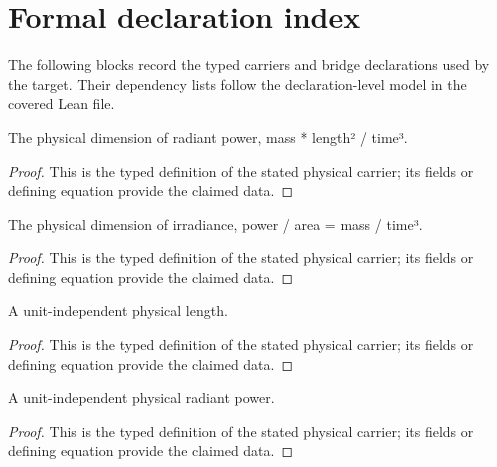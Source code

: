 \section*{Formal declaration index}
The following blocks record the typed carriers and bridge declarations used by the target.  Their dependency lists follow the declaration-level model in the covered Lean file.

\begin{definition}
  \label{def:physics:IPhO_2026_2_B_3:aux001}
  The physical dimension of radiant power, mass * length² / time³.
\end{definition}
\begin{proof}
  This is the typed definition of the stated physical carrier; its fields or defining equation provide the claimed data.
\end{proof}

\begin{definition}
  \label{def:physics:IPhO_2026_2_B_3:aux002}
  The physical dimension of irradiance, power / area = mass / time³.
\end{definition}
\begin{proof}
  This is the typed definition of the stated physical carrier; its fields or defining equation provide the claimed data.
\end{proof}

\begin{definition}
  \label{def:physics:IPhO_2026_2_B_3:aux003}
  A unit-independent physical length.
\end{definition}
\begin{proof}
  This is the typed definition of the stated physical carrier; its fields or defining equation provide the claimed data.
\end{proof}

\begin{definition}
  \label{def:physics:IPhO_2026_2_B_3:aux004}
  A unit-independent physical radiant power.
\end{definition}
\begin{proof}
  This is the typed definition of the stated physical carrier; its fields or defining equation provide the claimed data.
\end{proof}


